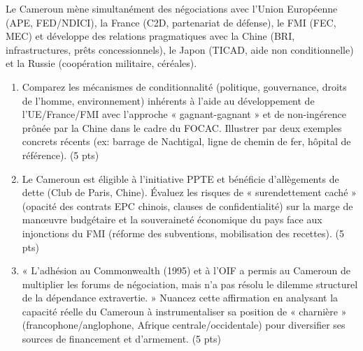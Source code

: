 \documentclass[11pt]{article}
\begin{document}
\begin{exercice}
Le Cameroun mène simultanément des négociations avec l'Union Européenne (APE, FED/NDICI), la France (C2D, partenariat de défense), le FMI (FEC, MEC) et développe des relations pragmatiques avec la Chine (BRI, infrastructures, prêts concessionnels), le Japon (TICAD, aide non conditionnelle) et la Russie (coopération militaire, céréales).
\begin{enumerate}
    \item Comparez les mécanismes de conditionnalité (politique, gouvernance, droits de l'homme, environnement) inhérents à l'aide au développement de l'UE/France/FMI avec l'approche « gagnant-gagnant » et de non-ingérence prônée par la Chine dans le cadre du FOCAC. Illustrer par deux exemples concrets récents (ex: barrage de Nachtigal, ligne de chemin de fer, hôpital de référence). (5 pts)
    \item Le Cameroun est éligible à l'initiative PPTE et bénéficie d'allègements de dette (Club de Paris, Chine). Évaluez les risques de « surendettement caché » (opacité des contrats EPC chinois, clauses de confidentialité) sur la marge de manœuvre budgétaire et la souveraineté économique du pays face aux injonctions du FMI (réforme des subventions, mobilisation des recettes). (5 pts)
    \item « L'adhésion au Commonwealth (1995) et à l'OIF a permis au Cameroun de multiplier les forums de négociation, mais n'a pas résolu le dilemme structurel de la dépendance extravertie. » Nuancez cette affirmation en analysant la capacité réelle du Cameroun à instrumentaliser sa position de « charnière » (francophone/anglophone, Afrique centrale/occidentale) pour diversifier ses sources de financement et d'armement. (5 pts)
\end{enumerate}
\end{exercice}
\end{document}
